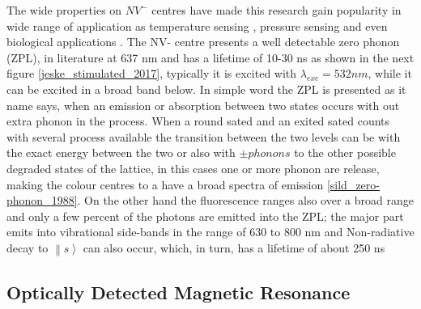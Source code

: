 The wide properties on $NV^{-}$ centres have made this research gain popularity in wide range of application as temperature sensing \cite{neumann_high-precision_2013}, pressure sensing \cite{doherty_electronic_2014} and even biological applications \cite{mcguinness_quantum_2011}. The NV- centre presents a well detectable zero phonon (ZPL), in literature at 637 nm  and has a lifetime of 10-30 ns as shown in the next figure \ref{jeske_stimulated_2017}, typically it is excited with $\lambda_{exc}=532nm$, while it can be excited in a broad band below. In simple word the ZPL is presented as it name says, when an emission or absorption between two states occurs with out extra phonon in the process. When a round sated and an exited sated counts with several process available the transition between the two levels can be with the exact energy between the two or also with $\pm phonons$ to the other possible degraded states of the lattice, in this cases one or more phonon are release, making the colour centres to a have a broad spectra of emission \ref{sild_zero-phonon_1988}.
On the other hand  the fluorescence ranges also over a broad range and only a few percent of the photons are emitted into the ZPL; the major part emits into vibrational side-bands in the range of 630 to 800 nm \cite{doherty} and  Non-radiative decay to $\left\|s\right\rangle$ can also occur, which, in turn, has a lifetime of about 250 ns \cite{schirhagl_nitrogen-vacancy_2014}

\subsection{Optically Detected Magnetic Resonance}

